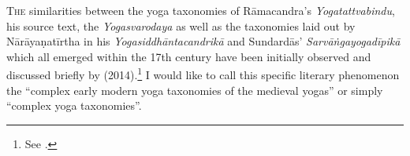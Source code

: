 
\noindent
\lettrine[lines=2, lhang=0.2, loversize=0.25]{T}{he} similarities between the yoga taxonomies of Rāmacandra's \textit{Yogatattvabindu}, his source text, the \textit{Yogasvarodaya} as well as the taxonomies laid out by Nārāyaṇatīrtha in his \textit{Yogasiddhāntacandrikā} and Sundardās' \textit{Sarvāṅgayogadīpikā} which all emerged within the 17th century have been initially observed and discussed briefly by \citeauthor{birch2014} (2014).\footnote{See \citeauthor[2014: 415-416]{birch2014}.} I would like to call this specific literary phenomenon the ``complex early modern yoga taxonomies of the medieval yogas'' or simply ``complex yoga taxonomies''.

